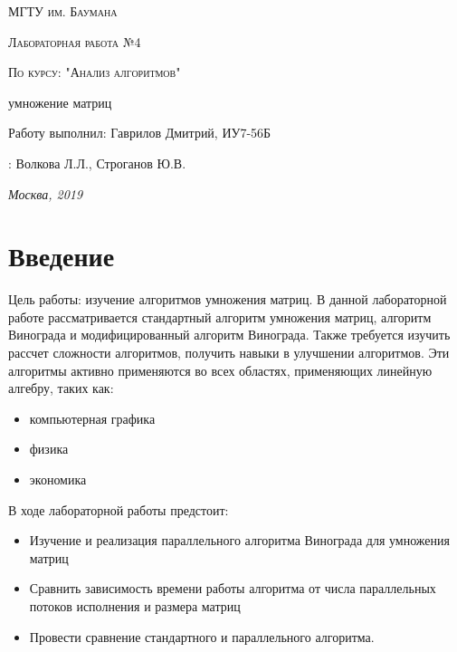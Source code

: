 \documentclass[12pt]{report}
\begin{document}
\begin{titlepage}
	\centering
	{\scshape\LARGE МГТУ им. Баумана \par}
	\vspace{3cm}
	{\scshape\Large Лабораторная работа №4\par}
	\vspace{0.5cm}	
	{\scshape\Large По курсу: "Анализ алгоритмов"\par}
	\vspace{1.5cm}
	{\huge{} умножение матриц\par}
	\vspace{2cm}
	\Large Работу выполнил: Гаврилов Дмитрий, ИУ7-56Б\par
	\vspace{0.5cm}
	:  Волкова Л.Л., Строганов Ю.В.\par

	\vfill
	\large \textit {Москва, 2019} \par
\end{titlepage}

\tableofcontents

\newpage
\chapter*{Введение}
Цель работы: изучение алгоритмов умножения матриц. В данной лабораторной работе рассматривается стандартный алгоритм умножения матриц, алгоритм Винограда и модифицированный алгоритм Винограда.  Также требуется изучить рассчет сложности алгоритмов, получить навыки в улучшении алгоритмов.
Эти алгоритмы активно применяются во всех областях, применяющих линейную алгебру, таких как:
\begin{itemize}
	\item компьютерная графика
	\item физика
	\item экономика
\end{itemize}


В ходе лабораторной работы предстоит:
\begin{itemize}
	\item  Изучение и реализация параллельного алгоритма Винограда для умножения матриц 
	\item Сравнить зависимость времени работы алгоритма от числа параллельных потоков исполнения и размера матриц 
	\item Провести сравнение стандартного и параллельного алгоритма.
\end{itemize}
\end{document}
